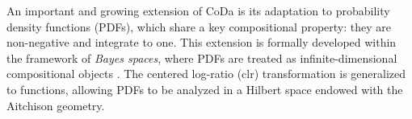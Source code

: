 \documentclass[
	12pt,				%
	oneside,			%
	a4paper,			%
	english,			%
	brazil				%
	]{abntex2ppgsi}
\begin{document}







An important and growing extension of CoDa is its adaptation to probability density functions (PDFs), which share a key compositional property: they are non-negative and integrate to one. This extension is formally developed within the framework of \textit{Bayes spaces}, where PDFs are treated as infinite-dimensional compositional objects \cite{egozcue2006hilbert}. The centered log-ratio (clr) transformation is generalized to functions, allowing PDFs to be analyzed in a Hilbert space endowed with the Aitchison geometry. 
\end{document}
